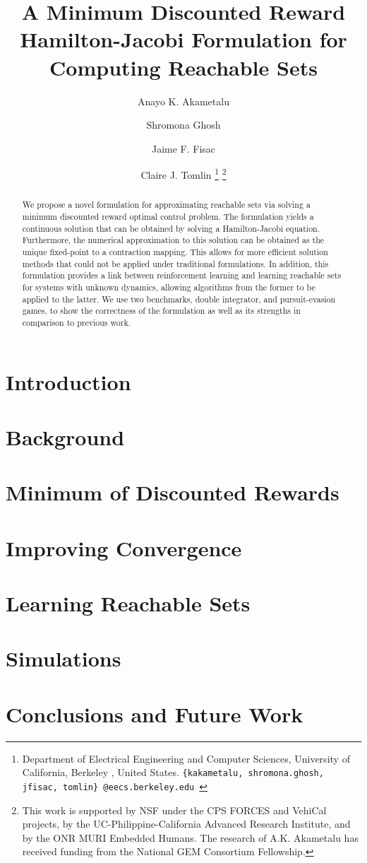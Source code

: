 \documentclass[journal,twoside,web]{ieeecolor}\onecolumnfalse
\title{\LARGE \bf
A Minimum Discounted Reward Hamilton-Jacobi Formulation for Computing Reachable Sets 
}
\author{
Anayo K. Akametalu \and Shromona Ghosh \and Jaime F. Fisac \and Claire J. Tomlin
\thanks{
 Department of Electrical Engineering and Computer Sciences, 
        University of California, Berkeley , United States.\newline
        {\tt\small \{kakametalu, shromona.ghosh, jfisac, tomlin\}~@eecs.berkeley.edu }}%
\thanks{
This work is supported by NSF under the CPS FORCES and VehiCal projects, by the UC-Philippine-California Advanced Research Institute, and by the ONR MURI Embedded Humans. The research of A.K. Akametalu has received funding from the National GEM Consortium Fellowship.} 
}
\begin{document}
\maketitle
\thispagestyle{empty}
\pagestyle{empty}

\begin{abstract}
We propose a novel formulation for approximating reachable sets via solving a minimum discounted reward optimal control problem. The formulation yields a continuous solution that can be obtained by solving a Hamilton-Jacobi equation. Furthermore, the numerical approximation to this solution can be obtained as the unique fixed-point to a contraction mapping. This allows for more efficient solution methods that could not be applied under traditional formulations. In addition, this formulation provides a link between reinforcement learning and learning reachable sets for systems with unknown dynamics, allowing algorithms from the former to be applied to the latter. We use two benchmarks, double integrator, and pursuit-evasion games, to show the correctness of the formulation as well as its strengths in comparison to previous work.
\end{abstract}


\section{Introduction \label{sec:intro}}


\section{Background \label{sec:back}} 


\section{Minimum of Discounted Rewards \label{sec:mdr}}


\section{Improving Convergence \label{sec:conv}}


\section{Learning Reachable Sets \label{sec:learn}}


\section{Simulations \label{sec:sim}}


\section{Conclusions and Future Work \label{sec:end}}






\printbibliography
\end{document}
